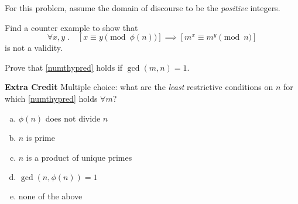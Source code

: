 \documentclass[12pt,oneside]{article}
\begin{document}
%
\instatements{\newpage}
\begin{problem}{10} For this problem, assume the domain of discourse
to be the \emph{positive} integers.

\bparts

 Find a counter example to show that
\begin{equation}\label{numthypred}
\forall x,y \; . \quad \left[ x \equiv y \pmod{\phi(n)} \right] 
  \implies \left[ m^x \equiv m^y \pmod{n} \right]
\end{equation}
is not a validity.

\solution{}

 Prove that \eqref{numthypred} holds if $\gcd(m,n)=1$.


 {\bf Extra Credit} Multiple choice: what are the 
\emph{least} restrictive conditions on $n$ for which 
\eqref{numthypred} holds $\forall m$? 

\begin{enumerate}[a.]

\item $\phi(n)$ does not divide $n$

\item $n$ is prime

\item $n$ is a product of unique primes

\item $\gcd(n,\phi(n))=1$

\item none of the above

\end{enumerate}


\eparts
\end{problem}
\end{document}

